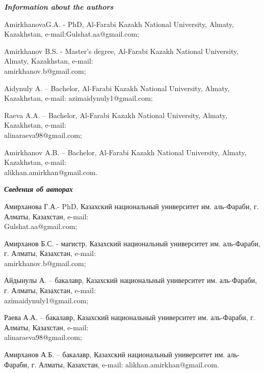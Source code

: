 \begin{info}
\emph{{\bfseries Information about the authors}}

AmirkhanovaG.A. - PhD, Al-Farabi Kazakh National University, Almaty,
Kazakhstan, e-mail:Gulshat.aa@gmail.com;

Amirkhanov B.S. - Master's degree, Al-Farabi Kazakh National
University, Almaty, Kazakhstan, e-mail: \\amirkhanov.b@gmail.com;

Aidynuly A. -- Bachelor, Al-Farabi Kazakh National University, Almaty,
Kazakhstan, e-mail: azimaidynuly1@gmail.com;

Raeva A.A. -- Bachelor, Al-Farabi Kazakh National University, Almaty,
Kazakhstan, e-mail: \\alinaraeva98@gmail.com;

Amirkhanov A.B. -- Bachelor, Al-Farabi Kazakh National University,
Almaty, Kazakhstan, e-mail: \\alikhan.amirkhan@gmail.com.

\emph{{\bfseries Сведения об авторах}}

Амирханова Г.А.- PhD, Казахский национальный университет
им. аль-Фараби, г. Алматы, Казахстан, e-mail: \\Gulshat.aa@gmail.com;

Амирханов Б.С. - магистр, Казахский национальный университет
им. аль-Фараби, г. Алматы, Казахстан, e-mail: \\amirkhanov.b@gmail.com;

Айдынулы А. -- бакалавр, Казахский национальный университет
им. аль-Фараби, г. Алматы, Казахстан, e-mail: \\azimaidynuly1@gmail.com;

Раева А.А. -- бакалавр, Казахский национальный университет
им. аль-Фараби, г. Алматы, Казахстан, e-mail: \\alinaraeva98@gmail.com;

Амирханов А.Б. -- бакалавр, Казахский национальный университет
им. аль-Фараби, г. Алматы, Казахстан, e-mail:
alikhan.amirkhan@gmail.com.
\end{info}
